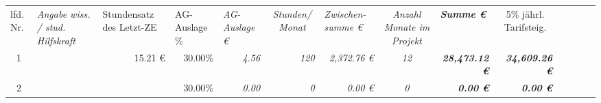 \begin{table}[]
\begin{tabular}{cllllrrrcrrrrrr}
\multicolumn{1}{l}{lfd. Nr.}                                                            & \multicolumn{2}{l}{\cellcolor[HTML]{FFFF99}\textit{Angabe wiss. / stud. Hilfskraft}} & \cellcolor[HTML]{FFFF99}Stundensatz des Letzt-ZE    & \cellcolor[HTML]{FFFF99}AG-Auslage \%               & \multicolumn{1}{l}{\cellcolor[HTML]{FFFF99}\textit{AG-Auslage €}} & \multicolumn{1}{c}{\textit{Stunden/ Monat}}                & \multicolumn{1}{l}{\textit{Zwischen-summe €}}                & \cellcolor[HTML]{FFFF99}\textit{Anzahl Monate im Projekt} & \multicolumn{1}{l}{\cellcolor[HTML]{92D050}\textit{\textbf{Summe €}}}    & \multicolumn{1}{c}{5\% jährl. Tarifsteig.}                                    & \multicolumn{1}{l}{\cellcolor[HTML]{92D050}\textit{}} & \multicolumn{1}{l}{\cellcolor[HTML]{FFFF99}\textit{}} & \multicolumn{1}{l}{\cellcolor[HTML]{BFBFBF}\textit{\textbf{}}}    & \multicolumn{1}{l}{\textit{\textbf{}}}                         \\
1                                                                                       & \multicolumn{2}{l}{\cellcolor[HTML]{FFFF99}\textit{}}                                & \multicolumn{1}{r}{\cellcolor[HTML]{FFFF99}15.21 €} & \multicolumn{1}{r}{\cellcolor[HTML]{FFFF99}30.00\%} & \cellcolor[HTML]{FFFF99}\textit{4.56}                             & \cellcolor[HTML]{FFFF99}\textit{120}                       & \textit{2,372.76 €}                                          & \cellcolor[HTML]{FFFF99}\textit{12}                       & \cellcolor[HTML]{92D050}\textit{\textbf{28,473.12 €}}                    & \cellcolor[HTML]{FFFF99}\textit{\textbf{34,609.26 €}}                         & \cellcolor[HTML]{92D050}\textit{}                     & \cellcolor[HTML]{FFFF99}\textit{}                     & \cellcolor[HTML]{BFBFBF}\textit{\textbf{}}                        & \textit{\textbf{}}                                             \\
2                                                                                       & \multicolumn{2}{l}{\cellcolor[HTML]{FFFF99}\textit{}}                                & \cellcolor[HTML]{FFFF99}                            & \multicolumn{1}{r}{\cellcolor[HTML]{FFFF99}30.00\%} & \cellcolor[HTML]{FFFF99}\textit{0.00}                             & \cellcolor[HTML]{FFFF99}\textit{0}                         & \textit{0.00 €}                                              & \cellcolor[HTML]{FFFF99}\textit{0}                        & \cellcolor[HTML]{92D050}\textit{\textbf{0.00 €}}                         & \cellcolor[HTML]{FFFF99}\textit{\textbf{0.00 €}}                              & \cellcolor[HTML]{92D050}\textit{}                     & \cellcolor[HTML]{FFFF99}\textit{}                     & \cellcolor[HTML]{BFBFBF}\textit{\textbf{}}                        & \textit{\textbf{}}                                             \\

\end{tabular}
\end{table}
